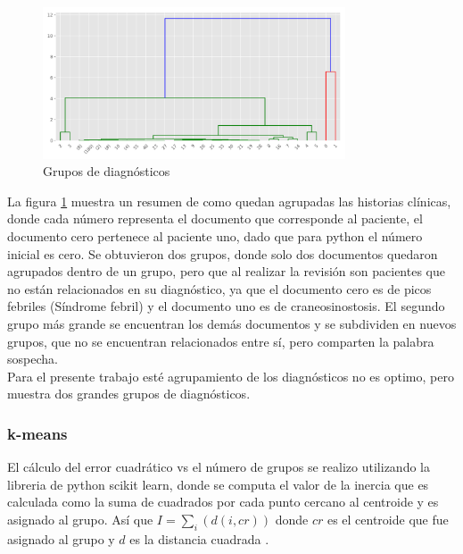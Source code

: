 \begin{figure}[H] 
	\centering
	\includegraphics[width=0.8\textwidth]{Kap4/averagercortado}
	\caption{Grupos de diagnósticos} 
	\label{fig:jerarquico}
\end{figure}

La figura \ref{fig:jerarquico} muestra un resumen de como quedan agrupadas las historias clínicas, donde cada número representa el documento que corresponde al paciente, el documento cero pertenece al paciente uno, dado que para python el número inicial es cero. Se obtuvieron dos grupos, donde solo dos documentos quedaron agrupados dentro de un grupo, pero que al realizar la revisión son pacientes que no están relacionados en su diagnóstico, ya que el documento cero es de picos febriles (Síndrome febril) y el documento uno es de craneosinostosis. El segundo grupo más grande se encuentran los demás documentos y se subdividen en nuevos grupos, que no se encuentran relacionados entre sí, pero comparten la palabra sospecha. \\

Para el presente trabajo esté agrupamiento de los diagnósticos no es optimo, pero muestra dos grandes grupos de diagnósticos. 

\subsubsection{k-means}

El cálculo del error cuadrático vs el número de grupos se realizo utilizando la libreria de python scikit learn, donde se computa el valor de la inercia que es calculada como la suma de cuadrados por cada punto cercano al centroide y es asignado al grupo. Así que  $I = \sum_{i}(d(i, cr))$ donde $cr$ es el centroide que fue asignado al grupo y $d$ es la distancia cuadrada \cite{scikit-learn}. 

